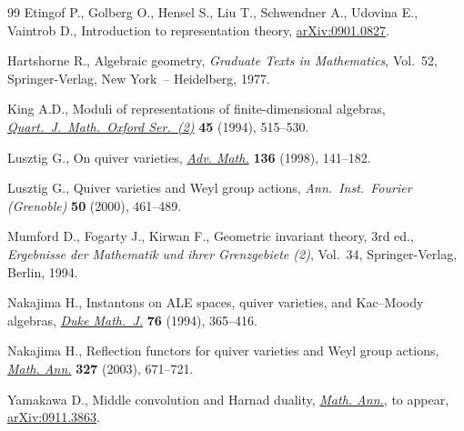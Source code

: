 \documentclass[11pt]{article}
\numberwithin{equation}{section}
\theoremstyle{definition}
\begin{document}
\begin{thebibliography}{99}
Etingof P., Golberg O., Hensel S., Liu T., Schwendner A., Udovina E., Vaintrob D.,
Introduction to representation theory,
\href{http://arxiv.org/abs/0901.0827}{arXiv:0901.0827}.

Hartshorne R.,
Algebraic geometry,
{\it Graduate Texts in Mathematics}, Vol.~52, Springer-Verlag, New York~-- Heidelberg, 1977.

King A.D.,
Moduli of representations of f\/inite-dimensional algebras,
\href{http://dx.doi.org/10.1093/qmath/45.4.515}{\emph{Quart.\ J.\ Math.\ Oxford Ser.~(2)}} \textbf{45} (1994),  515--530.

Lusztig G.,
On quiver varieties,
\href{http://dx.doi.org/10.1006/aima.1998.1729}{\emph{Adv. Math.}} \textbf{136} (1998), 141--182.

Lusztig G.,
Quiver varieties and Weyl group actions,
\emph{Ann.\ Inst.\ Fourier (Grenoble)} \textbf{50} (2000), 461--489.

Mumford D., Fogarty J., Kirwan F.,
Geometric invariant theory, 3rd ed.,
{\it Ergebnisse der Mathematik und ihrer Grenzgebiete (2)}, Vol.~34, Springer-Verlag, Berlin, 1994.

Nakajima H.,
Instantons on ALE spaces, quiver varieties, and Kac--Moody algebras,
\href{http://dx.doi.org/10.1215/S0012-7094-94-07613-8}{\emph{Duke Math.~J.}} \textbf{76} (1994), 365--416.

Nakajima H.,
Ref\/lection functors for quiver varieties and Weyl group actions,
\href{http://dx.doi.org/10.1007/s00208-003-0467-0}{\emph{Math. Ann.}} \textbf{327} (2003), 671--721.

Yamakawa D.,
Middle convolution and Harnad duality,
\href{http://dx.doi.org/10.1007/s00208-010-0517-3}{\emph{Math. Ann.}}, to appear,
\href{http://arxiv.org/abs/0911.3863}{arXiv:0911.3863}.

\end{thebibliography}
\end{document}

